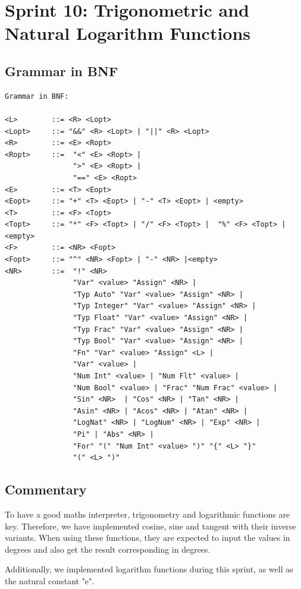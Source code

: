 \documentclass[a4paper, oneside, 11pt]{report}
\begin{document}
    \section{Sprint 10: Trigonometric and Natural Logarithm Functions}
    \subsection{Grammar in BNF}
    \begin{verbatim}
Grammar in BNF:

<L>        ::= <R> <Lopt>
<Lopt>     ::= "&&" <R> <Lopt> | "||" <R> <Lopt>
<R>        ::= <E> <Ropt>
<Ropt>     ::=  "<" <E> <Ropt> |
                ">" <E> <Ropt> |
                "==" <E> <Ropt>
<E>        ::= <T> <Eopt>
<Eopt>     ::= "+" <T> <Eopt> | "-" <T> <Eopt> | <empty>
<T>        ::= <F> <Topt>
<Topt>     ::= "*" <F> <Topt> | "/" <F> <Topt> |  "%" <F> <Topt> |<empty>
<F>        ::= <NR> <Fopt>
<Fopt>     ::= "^" <NR> <Fopt> | "-" <NR> |<empty>
<NR>       ::=  "!" <NR>
                "Var" <value> "Assign" <NR> |
                "Typ Auto" "Var" <value> "Assign" <NR> |
                "Typ Integer" "Var" <value> "Assign" <NR> |
                "Typ Float" "Var" <value> "Assign" <NR> |
                "Typ Frac" "Var" <value> "Assign" <NR> |
                "Typ Bool" "Var" <value> "Assign" <NR> |
                "Fn" "Var" <value> "Assign" <L> |
                "Var" <value> |
                "Num Int" <value> | "Num Flt" <value> |
                "Num Bool" <value> | "Frac" "Num Frac" <value> |
                "Sin" <NR>  | "Cos" <NR> | "Tan" <NR> |
                "Asin" <NR> | "Acos" <NR> | "Atan" <NR> |
                "LogNat" <NR> | "LogNum" <NR> | "Exp" <NR> |
                "Pi" | "Abs" <NR> |
                "For" "(" "Num Int" <value> ")" "{" <L> "}"
                "(" <L> ")"
    \end{verbatim}
    \subsection{Commentary}
    To have a good maths interpreter, trigonometry and logarithmic functions are key. Therefore, we have implemented cosine, sine and tangent with their inverse variants. When using these functions, they are expected to input the values in degrees and also get the result corresponding in degrees.

    Additionally, we implemented logarithm functions during this sprint, as well as the natural constant "e".
\end{document}
